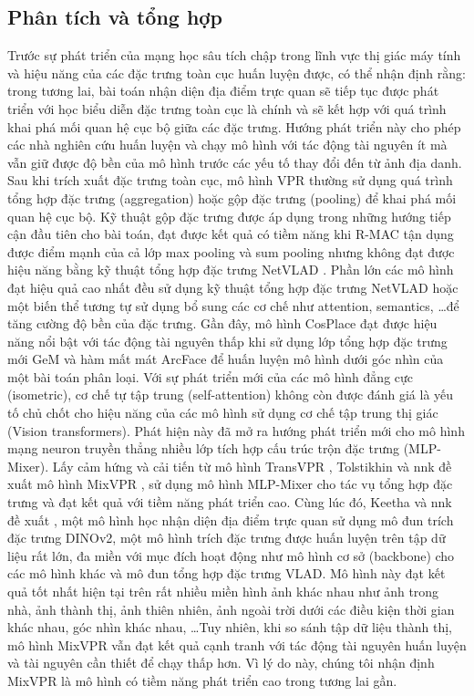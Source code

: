 \subsection{Phân tích và tổng hợp}

Trước sự phát triển của mạng học sâu tích chập trong lĩnh vực thị giác máy tính và hiệu năng của các đặc trưng toàn cục huấn luyện được, có thể nhận định rằng: trong tương lai, bài toán nhận diện địa điểm trực quan sẽ tiếp tục được phát triển với học biểu diễn đặc trưng toàn cục là chính và sẽ kết hợp với quá trình khai phá mối quan hệ cục bộ giữa các đặc trưng. Hướng phát triển này cho phép các nhà nghiên cứu huấn luyện và chạy mô hình với tác động tài nguyên ít mà vẫn giữ được độ bền của mô hình trước các yếu tố thay đổi đến từ ảnh địa danh. Sau khi trích xuất đặc trưng toàn cục, mô hình VPR thường sử dụng quá trình tổng hợp đặc trưng (aggregation) hoặc gộp đặc trưng (pooling) để khai phá mối quan hệ cục bộ. Kỹ thuật gộp đặc trưng được áp dụng trong những hướng tiếp cận đầu tiên cho bài toán, đạt được kết quả có tiềm năng khi R-MAC \cite{imageSearchKernel} tận dụng được điểm mạnh của cả lớp max pooling và sum pooling nhưng không đạt được hiệu năng bằng kỹ thuật tổng hợp đặc trưng NetVLAD \cite{arandjelovic2016netvlad}. Phần lớn các mô hình đạt hiệu quả cao nhất đều sử dụng kỹ thuật tổng hợp đặc trưng NetVLAD hoặc một biến thể tương tự sử dụng bổ sung các cơ chế như attention, semantics, \dots để tăng cường độ bền của đặc trưng. Gần đây, mô hình CosPlace \cite{berton2022rethinking} đạt được hiệu năng nổi bật với tác động tài nguyên thấp khi sử dụng lớp tổng hợp đặc trưng mới GeM \cite{GeM} và hàm mất mát ArcFace \cite{Deng_2022} để huấn luyện mô hình dưới góc nhìn của một bài toán phân loại. Với sự phát triển mới của các mô hình đẳng cực (isometric), cơ chế tự tập trung (self-attention) không còn được đánh giá là yếu tố chủ chốt cho hiệu năng của các mô hình sử dụng cơ chế tập trung thị giác (Vision transformers). Phát hiện này đã mở ra hướng phát triển mới cho mô hình mạng neuron truyền thẳng nhiều lớp tích hợp cấu trúc trộn đặc trưng (MLP-Mixer). Lấy cảm hứng và cải tiến từ mô hình TransVPR \cite{wang2022transvpr}, Tolstikhin và nnk đề xuất mô hình MixVPR \cite{alibey2023mixvpr}, sử dụng mô hình MLP-Mixer cho tác vụ tổng hợp đặc trưng và đạt kết quả với tiềm năng phát triển cao. Cùng lúc đó, Keetha và nnk đề xuất \cite{keetha2023anyloc}, một mô hình học nhận diện địa điểm trực quan sử dụng mô đun trích đặc trưng DINOv2, một mô hình trích đặc trưng được huấn luyện trên tập dữ liệu rất lớn, đa miền với mục đích hoạt động như mô hình cơ sở (backbone) cho các mô hình khác và mô đun tổng hợp đặc trưng VLAD. Mô hình này đạt kết quả tốt nhất hiện tại trên rất nhiều miền hình ảnh khác nhau như ảnh trong nhà, ảnh thành thị, ảnh thiên nhiên, ảnh ngoài trời dưới các điều kiện thời gian khác nhau, góc nhìn khác nhau, \dots Tuy nhiên, khi so sánh tập dữ liệu thành thị, mô hình MixVPR vẫn đạt kết quả cạnh tranh với tác động tài nguyên huấn luyện và tài nguyên cần thiết để chạy thấp hơn. Vì lý do này, chúng tôi nhận định MixVPR là mô hình có tiềm năng phát triển cao trong tương lai gần.
